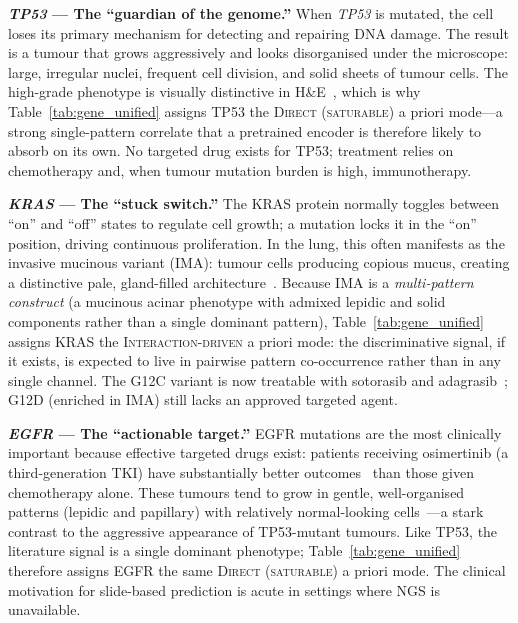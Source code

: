 \textbf{\textit{TP53} --- The ``guardian of the genome.''}
When \textit{TP53} is mutated, the cell loses its primary mechanism
for detecting and repairing DNA damage.
The result is a tumour that grows aggressively and looks disorganised
under the microscope: large, irregular nuclei, frequent cell division,
and solid sheets of tumour cells.
The high-grade phenotype is visually distinctive in
H\&E~\cite{ahn2022tp53highgrade},
which is why Table~\ref{tab:gene_unified} assigns TP53 the
\textsc{Direct (saturable)} a priori mode---a strong single-pattern
correlate that a pretrained encoder is therefore likely to absorb on
its own.
No targeted drug exists for TP53; treatment relies on chemotherapy and,
when tumour mutation burden is high, immunotherapy.

\textbf{\textit{KRAS} --- The ``stuck switch.''}
The KRAS protein normally toggles between ``on'' and ``off'' states to
regulate cell growth; a mutation locks it in the ``on'' position,
driving continuous proliferation.
In the lung, this often manifests as the invasive mucinous variant
(IMA): tumour cells producing copious mucus, creating a distinctive
pale, gland-filled architecture~\cite{shim2015krasmucinous}.
Because IMA is a \emph{multi-pattern construct} (a mucinous acinar
phenotype with admixed lepidic and solid components rather than a
single dominant pattern), Table~\ref{tab:gene_unified} assigns KRAS
the \textsc{Interaction-driven} a priori mode: the discriminative
signal, if it exists, is expected to live in pairwise pattern
co-occurrence rather than in any single channel.
The G12C variant is now treatable with sotorasib and
adagrasib~\cite{skoulidis2021codebreak}; G12D (enriched in IMA) still
lacks an approved targeted agent.

\textbf{\textit{EGFR} --- The ``actionable target.''}
EGFR mutations are the most clinically important because effective
targeted drugs exist: patients receiving osimertinib (a
third-generation TKI) have substantially better
outcomes~\cite{soria2018flaura} than those given chemotherapy alone.
These tumours tend to grow in gentle, well-organised patterns
(lepidic and papillary) with relatively
normal-looking cells~\cite{yoshizawa2013egfrmorph}---a stark contrast
to the aggressive appearance of TP53-mutant tumours.
Like TP53, the literature signal is a single dominant phenotype;
Table~\ref{tab:gene_unified} therefore assigns EGFR the same
\textsc{Direct (saturable)} a priori mode.
The clinical motivation for slide-based prediction is acute in
settings where NGS is unavailable.

